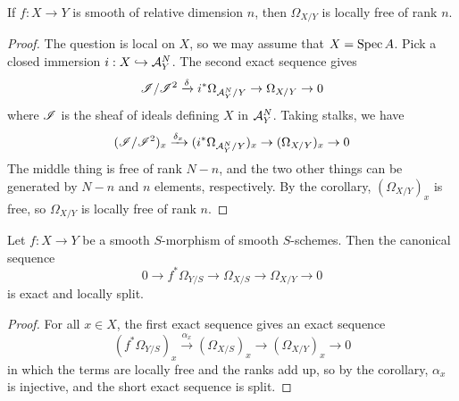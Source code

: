  \begin{proposition}
 If $f:X\to Y$ is smooth of relative dimension $n$, then $\Omega_{X/Y}$ is locally
 free of rank $n$.
 \end{proposition}
 \begin{proof}
 The question is local on $X$, so we may assume that $X=\text{\rm Spec\,} A$.
 Pick a closed immersion $i:X\hookrightarrow \mathcal{A}^N_Y$.  The second
 exact sequence gives
 \[
    \mathscr{I}/\mathscr{I}^2 \xrightarrow{\delta} i^*\Omega_{\mathcal{A}^N_Y/Y} \to \Omega_{X/Y}\to 0
 \]
 where $\mathscr{I}$ is the sheaf of ideals defining $X$ in $\mathcal{A}^N_Y$.
 Taking stalks, we have
 \[
    (\mathscr{I}/\mathscr{I}^2)_x \xrightarrow{\delta_x} (i^*\Omega_{\mathcal{A}^N_Y/Y})_x \to (\Omega_{X/Y})_x\to 0
 \]
 The middle thing is free of rank $N-n$, and the two other things
 can be generated by $N-n$ and $n$ elements, respectively.  By the
 corollary, $(\Omega_{X/Y})_x$ is free, so $\Omega_{X/Y}$ is
 locally free of rank $n$.
 \end{proof}

 \begin{lemma}
 Let $f:X\to Y$ be a smooth $S$-morphism of smooth $S$-schemes.
 Then the canonical sequence
 \[
    0\to f^*\Omega_{Y/S} \to \Omega_{X/S} \to \Omega_{X/Y}\to 0
 \]
 is exact and locally split.
 \end{lemma}
 \begin{proof}
 For all $x\in X$, the first exact sequence gives an exact
 sequence
 \[
    (f^*\Omega_{Y/S})_x\xrightarrow{\alpha_x} (\Omega_{X/S})_x \to (\Omega_{X/Y})_x
    \to 0
 \]
 in which the terms are locally free and the ranks add up, so by
 the corollary, $\alpha_x$ is injective, and the short exact
 sequence is split.
 \end{proof}

